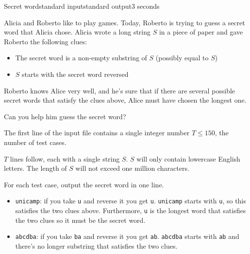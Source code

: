 \begin{problem}{Secret word}{standard input}{standard output}{3 seconds}

Alicia and Roberto like to play games. Today, Roberto is trying to guess a secret word that Alicia chose. Alicia wrote a long string $S$ in a piece of paper and gave Roberto the following clues:

\begin{itemize}
  \item{The secret word is a non-empty substring of $S$ (possibly equal to $S$)}
  \item{$S$ starts with the secret word reversed}
\end{itemize}

Roberto knows Alice very well, and he's sure that if there are several possible secret words that satisfy the clues above, Alice must have chosen the longest one.

Can you help him guess the secret word?

\InputFile

The first line of the input file contains a single integer number $T \leq 150$, the number of test cases.

$T$ lines follow, each with a single string $S$. $S$ will only contain lowercase English letters. The length of $S$ will not exceed one million characters.

\OutputFile

For each test case, output the secret word in one line.

\Example

\begin{example}
%
\end{example}

{\beforeproblemsectioncaption{}\nopagebreak\par\afterproblemsectioncaption}%

\begin{itemize}
  \item{\texttt{unicamp}: if you take \texttt{u} and reverse it you get \texttt{u}. \texttt{unicamp} starts with \texttt{u}, so this satisfies the two clues above. Furthermore, \texttt{u} is the longest word that satisfies the two clues so it must be the secret word.}
  
  \item{\texttt{abcdba}: if you take \texttt{ba} and reverse it you get \texttt{ab}. \texttt{abcdba} starts with \texttt{ab} and there's no longer substring that satisfies the two clues.}
  

\end{itemize}
\end{problem}
